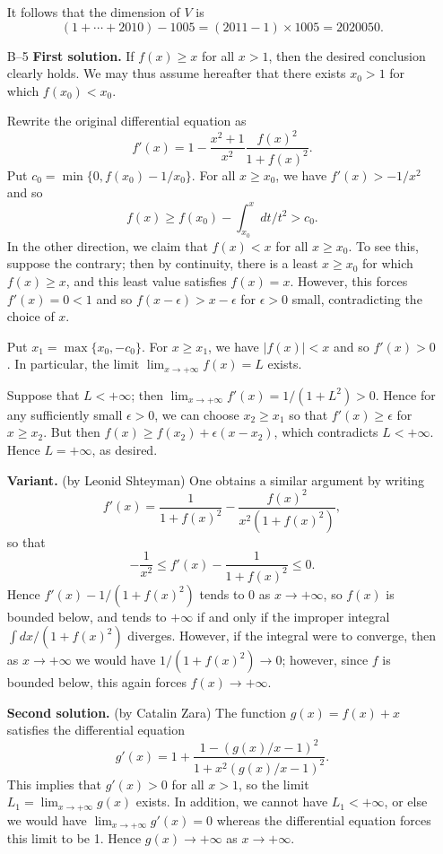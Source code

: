 \documentclass[amssymb,twocolumn,pra,10pt,aps]{revtex4-1}
\begin{document}
\begin{itemize}
It follows that the dimension of $V$ is
\[
(1 + \cdots + 2010) - 1005 = (2011 - 1) \times 1005 = 2020050.
\]

\item[B--5]
\textbf{First solution.}
If $f(x) \geq x$ for all $x > 1$, then the desired conclusion clearly holds.
We may thus assume hereafter that there exists $x_0 > 1$ for which $f(x_0) < x_0$.

Rewrite the original differential equation as
\[
 f'(x) = 1 - \frac{x^2 + 1}{x^2} \frac{f(x)^2}{1 + f(x)^2}.
\]
Put $c_0 = \min\{0, f(x_0) - 1/x_0\}$.
For all $x \geq x_0$, we have $f'(x) > -1/x^2$ and so
\[
f(x) \geq f(x_0) -\int_{x_0}^x dt/t^2 > c_0.
\]
In the other direction, we claim that $f(x) < x$ for all $x \geq x_0$.
To see this, suppose the contrary; then by continuity, there is a least
$x \geq x_0$ for which $f(x) \geq x$, and this least value satisfies $f(x) = x$.
However, this forces $f'(x) = 0 < 1$ and so
$f(x-\epsilon) > x-\epsilon$ for $\epsilon > 0$ small,
contradicting the choice of $x$.

Put $x_1 = \max\{x_0, -c_0\}$. For $x \geq x_1$, we have
$|f(x)| < x$ and so $f'(x) > 0$.
In particular, the limit $\lim_{x \to +\infty} f(x) = L$
exists.

Suppose that $L < +\infty$; then $\lim_{x \to +\infty}
f'(x) = 1/(1 + L^2) > 0$. Hence for any sufficiently small $\epsilon > 0$,
we can choose $x_2 \geq x_1$ so that $f'(x) \geq \epsilon$
for $x \geq x_2$. But then $f(x) \geq f(x_2) + \epsilon(x-x_2)$,
which contradicts $L < +\infty$. Hence $L = +\infty$,
as desired.

\textbf{Variant.} (by Leonid Shteyman) One obtains a similar argument by
writing
\[
 f'(x) = \frac{1}{1 + f(x)^2} - \frac{f(x)^2}{x^2(1+f(x)^2)},
\]
so that
\[
-\frac{1}{x^2} \leq f'(x) - \frac{1}{1 + f(x)^2} \leq 0.
\]
Hence $f'(x) - 1/(1 + f(x)^2)$ tends to 0 as $x \to +\infty$, so $f(x)$ is bounded below, and
tends to $+\infty$
if and only if the improper integral $\int dx/(1+f(x)^2)$ diverges. However, if the integral were to
converge, then as $x \to +\infty$ we would have $1/(1+f(x)^2) \to 0$; however, since $f$ is bounded below,
this again forces $f(x) \to +\infty$.

\textbf{Second solution.} (by Catalin Zara)
The function $g(x) = f(x)+x$ satisfies the differential equation
\[
g'(x) = 1 + \frac{1 - (g(x)/x - 1)^2}{1 + x^2(g(x)/x - 1)^2}.
\]
This implies that $g'(x) > 0$ for all $x > 1$, so
the limit $L_1 = \lim_{x \to +\infty} g(x)$ exists. In addition, we cannot have
$L_1 < +\infty$, or else we would have
$\lim_{x \to +\infty} g'(x) = 0$ whereas the differential equation forces
this limit to be 1.
Hence $g(x) \to +\infty$ as $x \to +\infty$.


\end{itemize}
\end{document}
